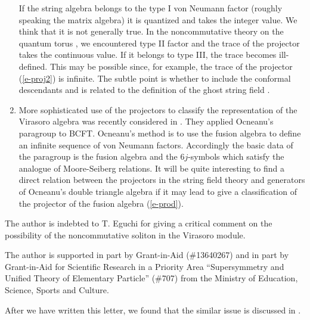 \documentclass[a4paper,12pt]{article}
\begin{document}
\begin{enumerate}
If the string algebra belongs to the
type I von Neumann factor (roughly speaking the matrix algebra)
it is quantized and takes the integer value.  We think that it
is not generally true.  In the noncommutative theory on the
quantum torus \cite{r-qtorus}, we encountered type II factor
and the trace of the projector 
takes the continuous value.  If it belongs to
type III, the trace becomes ill-defined.  This may be possible
since, for example,
the trace of the projector (\ref{e-proj2}) is infinite.
The subtle point is whether to include the conformal descendants
and is related to the definition of the ghost string field
\cite{r-RSZ1, r-RSZ2}.
\item More sophisticated use of the projectors to classify the 
representation of the Virasoro algebra was recently considered
in \cite{r-PZ}. They applied Ocneanu's paragroup 
\cite{r-Ocneanu,r-subfactors}
to BCFT. Ocneanu's method is to use the
fusion algebra to define an infinite sequence of von Neumann factors.
Accordingly the basic data of the paragroup is the fusion
algebra and the $6j$-symbols which satisfy the analogue of
Moore-Seiberg relations\cite{r-MS}. It will be quite interesting
to find a direct relation between the projectors in the string
field theory and generators of Ocneanu's double triangle algebra
\cite{r-PZ} if it may lead to give a classification of the projector
of the fusion algebra (\ref{e-prod}).
\end{enumerate}

The author is indebted to T. Eguchi for giving a critical 
comment on the possibility of the 
noncommutative soliton in the Virasoro module.

The author is supported in part by Grant-in-Aid (\#13640267)
and in part by Grant-in-Aid for Scientific Research
in a Priority Area ``Supersymmetry and Unified Theory of 
Elementary Particle'' (\#707) from the Ministry of Education,
Science, Sports and Culture.


\vskip 5mm



 After we have written this letter,
we found that the similar issue is discussed in \cite{r-RSZ3}.
\end{document}
